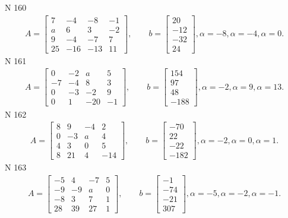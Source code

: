 \documentclass[11pt]{report}
\begin{document}
N 160
\begin{align*}
 A = \left[\begin{matrix}7 & -4 & -8 & -1\\a & 6 & 3 & -2\\9 & -4 & -7 & 7\\25 & -16 & -13 & 11\end{matrix}\right],
    \qquad b = \left[\begin{matrix}20\\-12\\-32\\24\end{matrix}\right], \alpha = -8, \alpha = -4, \alpha = 0. 
 \end{align*}
N 161
\begin{align*}
 A = \left[\begin{matrix}0 & -2 & a & 5\\-7 & -4 & 8 & 3\\0 & -3 & -2 & 9\\0 & 1 & -20 & -1\end{matrix}\right],
    \qquad b = \left[\begin{matrix}154\\97\\48\\-188\end{matrix}\right], \alpha = -2, \alpha = 9, \alpha = 13. 
 \end{align*}
N 162
\begin{align*}
 A = \left[\begin{matrix}8 & 9 & -4 & 2\\0 & -3 & a & 4\\4 & 3 & 0 & 5\\8 & 21 & 4 & -14\end{matrix}\right],
    \qquad b = \left[\begin{matrix}-70\\22\\-22\\-182\end{matrix}\right], \alpha = -2, \alpha = 0, \alpha = 1. 
 \end{align*}
N 163
\begin{align*}
 A = \left[\begin{matrix}-5 & 4 & -7 & 5\\-9 & -9 & a & 0\\-8 & 3 & 7 & 1\\28 & 39 & 27 & 1\end{matrix}\right],
    \qquad b = \left[\begin{matrix}-1\\-74\\-21\\307\end{matrix}\right], \alpha = -5, \alpha = -2, \alpha = -1. 
 \end{align*}
\end{document}
